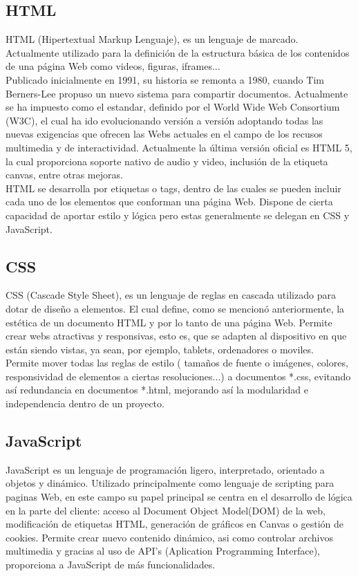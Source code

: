 \documentclass[11pt,a4paper]{book}
\begin{document}
			\subsection{HTML}
				HTML (Hipertextual Markup Lenguaje), es un lenguaje de marcado. Actualmente utilizado para la definición de la estructura básica de los contenidos de una página Web como videos, figuras, iframes... \\
				
				Publicado inicialmente en 1991, su historia se remonta a 1980, cuando Tim Berners-Lee propuso un nuevo sistema para compartir documentos. Actualmente se ha impuesto como el estandar, definido por el World Wide Web Consortium (W3C), el cual ha ido evolucionando versión a versión adoptando todas las nuevas exigencias que ofrecen las Webs actuales en el campo de los recusos multimedia y de interactividad. Actualmente la última versión oficial es HTML 5, la cual proporciona soporte nativo de audio y video, inclusión de la etiqueta canvas, entre otras mejoras.\\
				
				HTML se desarrolla por etiquetas o tags, dentro de las cuales se pueden incluir cada uno de los elementos que conforman una página Web. Dispone de cierta capacidad de aportar estilo y lógica pero estas generalmente se delegan en CSS y JavaScript.
			\subsection{CSS}
				CSS (Cascade Style Sheet), es un lenguaje de reglas en cascada utilizado para dotar de diseño a elementos. El cual define, como se mencionó anteriormente, la estética de un documento HTML y por lo tanto de una página Web. Permite crear webs atractivas y responsivas, esto es, que se adapten al dispositivo en que están siendo vistas, ya sean, por ejemplo, tablets, ordenadores o moviles.\\
				
				Permite mover todas las reglas de estilo
				( tamaños de fuente o imágenes, colores, responsividad de elementos a ciertas resoluciones...) a documentos *.css, evitando así redundancia en documentos *.html, mejorando así la modularidad e independencia dentro de un proyecto.
			\subsection{JavaScript}
				JavaScript es un lenguaje de programación ligero, interpretado, orientado a objetos y dinámico. Utilizado principalmente como lenguaje de scripting para paginas Web, en este campo su papel principal se centra en el desarrollo de lógica en la parte del cliente: acceso al Document Object Model(DOM) de la web, modificación de etiquetas HTML, generación de gráficos en Canvas o gestión de cookies.
				Permite crear nuevo contenido dinámico, asi como controlar archivos multimedia y gracias al uso de API's (Aplication Programming Interface), proporciona a JavaScript de más funcionalidades.
				
\end{document}
